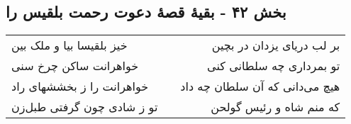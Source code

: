 \begin{center}
\section*{بخش ۴۲ - بقیهٔ قصهٔ دعوت رحمت بلقیس را}
\label{sec:sh042}
\begin{longtable}{l p{0.5cm} r}
خیز بلقیسا بیا و ملک بین
&&
بر لب دریای یزدان در بچین
\\
خواهرانت ساکن چرخ سنی
&&
تو بمرداری چه سلطانی کنی
\\
خواهرانت را ز بخششهای راد
&&
هیچ می‌دانی که آن سلطان چه داد
\\
تو ز شادی چون گرفتی طبل‌زن
&&
که منم شاه و رئیس گولحن
\\
\end{longtable}
\end{center}
